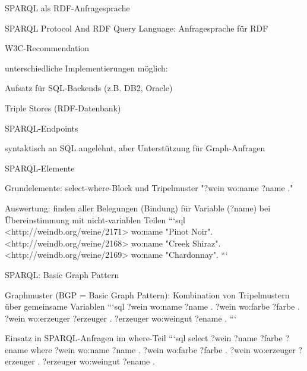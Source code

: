 \documentclass[a4paper]{article}
\begin{document}
\begin{multicols}{3}
\begin{itemize*}
        SPARQL als RDF-Anfragesprache
        \begin{itemize*}
            \item SPARQL Protocol And RDF Query Language: Anfragesprache für RDF
            \item W3C-Recommendation
            \item unterschiedliche Implementierungen möglich:
            \begin{itemize*}
                \item Aufsatz für SQL-Backends (z.B. DB2, Oracle)
                \item Triple Stores (RDF-Datenbank)
                \item SPARQL-Endpoints
            \end{itemize*}
            \item syntaktisch an SQL angelehnt, aber Unterstützung für Graph-Anfragen
            \item SPARQL-Elemente
            \begin{itemize*}
                \item Grundelemente: select-where-Block und Tripelmuster "?wein wo:name ?name ."
                \item Auswertung: finden aller Belegungen (Bindung) für Variable (?name) bei Übereinstimmung mit nicht-variablen Teilen
                ```sql
                <http://weindb.org/weine/2171> wo:name "Pinot Noir".
                <http://weindb.org/weine/2168> wo:name "Creek Shiraz".
                <http://weindb.org/weine/2169> wo:name "Chardonnay".
                ```
            \end{itemize*}
            \item SPARQL: Basic Graph Pattern
            \begin{itemize*}
                \item Graphmuster (BGP = Basic Graph Pattern): Kombination von Tripelmustern über gemeinsame Variablen
                ```sql
                ?wein wo:name ?name .
                ?wein wo:farbe ?farbe .
                ?wein wo:erzeuger ?erzeuger .
                ?erzeuger wo:weingut ?ename .
                ```
                \item Einsatz in SPARQL-Anfragen im where-Teil
                ```sql
                select ?wein ?name ?farbe ?ename
                where { ?wein wo:name ?name .
                        ?wein wo:farbe ?farbe .
                        ?wein wo:erzeuger ?erzeuger .
                        ?erzeuger wo:weingut ?ename . }

\end{itemize*}
\end{itemize*}
\end{itemize*}
\end{multicols}
\end{document}
